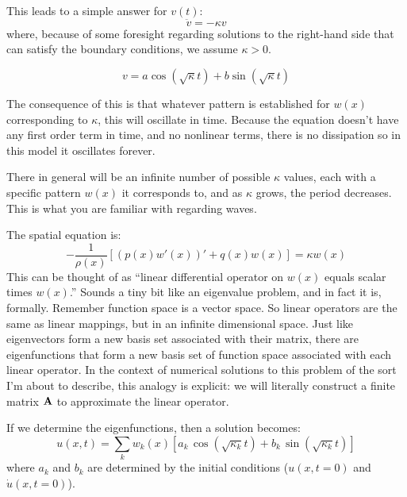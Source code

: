 This leads to a simple answer for $v(t)$:
\begin{equation}
\ddot{v} = - \kappa v
\end{equation}
where, because of some foresight regarding solutions to the right-hand
side that can satisfy the boundary conditions, we assume $\kappa>0$.


\begin{answer}
\begin{equation}
v = a \cos(\sqrt{\kappa} t) + b \sin(\sqrt{\kappa} t)
\end{equation}

The consequence of this is that whatever pattern is established for
$w(x)$ corresponding to $\kappa$, this will oscillate in
time. Because the equation doesn't have any first order term in time,
and no nonlinear terms, there is no dissipation so in this model it
oscillates forever.

There in general will be an infinite number of possible $\kappa$
values, each with a specific pattern $w(x)$ it corresponds to, and as
$\kappa$ grows, the period decreases. This is what you are familiar
with regarding waves.
\end{answer}

The spatial equation is:
\begin{equation}
- \frac{1}{\rho(x)} \left[\left(p(x) w'(x)\right)' + q(x) w(x)\right] =
\kappa w(x)
\end{equation}
This can be thought of as ``linear differential operator on $w(x)$
equals scalar times $w(x)$.'' Sounds a tiny bit like an eigenvalue
problem, and in fact it is, formally. Remember function space is a
vector space. So linear operators are the same as linear mappings, but
in an infinite dimensional space. Just like eigenvectors form a new
basis set associated with their matrix, there are eigenfunctions  that
form a new basis set of function space associated with each linear
operator. In the context of numerical solutions to this problem of the
sort I'm about to describe, this analogy is explicit: we will
literally construct a finite matrix ${\bf A}$ to approximate the
linear operator.

If we determine the eigenfunctions, then a solution becomes:
\begin{equation}
u(x,t) = \sum_{k} w_k(x) \left[ a_k\, \cos(\sqrt{\kappa_k} t) + b_k\,
  \sin(\sqrt{\kappa_k} t) \right]
\end{equation}
where $a_k$ and $b_k$ are determined by the initial conditions
($u(x, t=0)$ and $\dot{u}(x, t=0)$).

